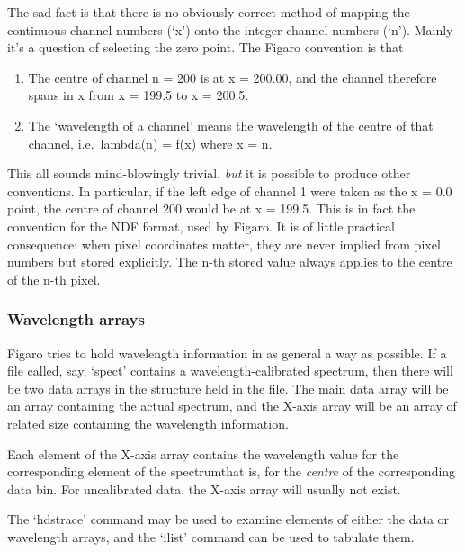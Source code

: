    The sad fact is that there is no obviously correct method of mapping
   the continuous channel numbers (`x') onto the integer channel numbers
   (`n').  Mainly it's a question of selecting the zero point.  The
   Figaro convention is that

\begin{enumerate}
\item
   The centre of channel n = 200 is at x = 200.00, and the channel
   therefore spans in x from x = 199.5 to x = 200.5.
\item
   The `wavelength of a channel' means the wavelength of the centre
   of that channel, i.e.\ lambda(n) = f(x) where x = n.
\end{enumerate}

   This all sounds mind-blowingly trivial, {\em but\/}
   it is possible to produce other conventions. In particular, if the
   left edge of channel 1 were taken as the x = 0.0 point, the centre of
   channel 200 would be at x = 199.5. This is in fact the convention for
   the NDF format, used by Figaro. It is of little practical
   consequence: when pixel coordinates matter, they are never implied
   from pixel numbers but stored explicitly. The n-th stored value
   always applies to the centre of the n-th pixel.


\subsubsection{\label{techno8wavearray}Wavelength arrays}

   Figaro tries to hold wavelength information in as general a way as
   possible.  If a file called, say, `spect' contains a
   wavelength-calibrated spectrum, then there will be two data arrays in
   the structure held in the file.  The main data array will be an array
   containing the actual spectrum, and the X-axis array will be an array
   of related size containing the wavelength information.

   Each element of the X-axis array contains the wavelength value for
   the corresponding element of the spectrum\latorhtm{---}{-}that is, for the
{\em centre\/}
   of the corresponding data bin.  For uncalibrated data, the X-axis
   array will usually not exist.

   The `hdstrace' command may be used to examine elements of either the data
   or wavelength arrays, and the `ilist' command can be used to tabulate
   them.

